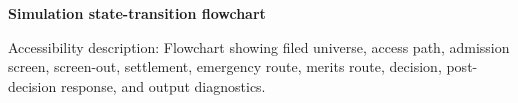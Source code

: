 \documentclass[11pt]{article}
\begin{document}
\noindent\textbf{Simulation state-transition flowchart}\par
\smallskip
\noindent
\par\smallskip
\noindent\footnotesize Accessibility description: Flowchart showing filed universe, access path, admission screen, screen-out, settlement, emergency route, merits route, decision, post-decision response, and output diagnostics.
\end{document}
